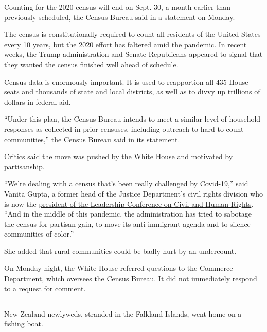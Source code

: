 Counting for the 2020 census will end on Sept. 30, a month earlier than
previously scheduled, the Census Bureau said in a statement on Monday.

The census is constitutionally required to count all residents of the
United States every 10 years, but the 2020 effort
\href{https://www.nytimes3xbfgragh.onion/2020/04/18/us/coronavirus-census.html}{has
faltered amid the pandemic}. In recent weeks, the Trump administration
and Senate Republicans appeared to signal that they
\href{https://www.nytimes3xbfgragh.onion/2020/07/28/us/trump-census.html}{wanted
the census finished well ahead of schedule}.

Census data is enormously important. It is used to reapportion all 435
House seats and thousands of state and local districts, as well as to
divvy up trillions of dollars in federal aid.

``Under this plan, the Census Bureau intends to meet a similar level of
household responses as collected in prior censuses, including outreach
to hard-to-count communities,'' the Census Bureau said in its
\href{https://www.census.gov/newsroom/press-releases/2020/delivering-complete-accurate-count.html}{statement}.

Critics said the move was pushed by the White House and motivated by
partisanship.

``We're dealing with a census that's been really challenged by
Covid-19,'' said Vanita Gupta, a former head of the Justice Department's
civil rights division who is now the
\href{https://civilrights.org/about/our-staff/vanita-gupta/}{president
of the Leadership Conference on Civil and Human Rights}. ``And in the
middle of this pandemic, the administration has tried to sabotage the
census for partisan gain, to move its anti-immigrant agenda and to
silence communities of color.''

She added that rural communities could be badly hurt by an undercount.

On Monday night, the White House referred questions to the Commerce
Department, which oversees the Census Bureau. It did not immediately
respond to a request for comment.

\hypertarget{-5}{%
\subsection{}\label{-5}}

New Zealand newlyweds, stranded in the Falkland Islands, went home on a
fishing boat.

